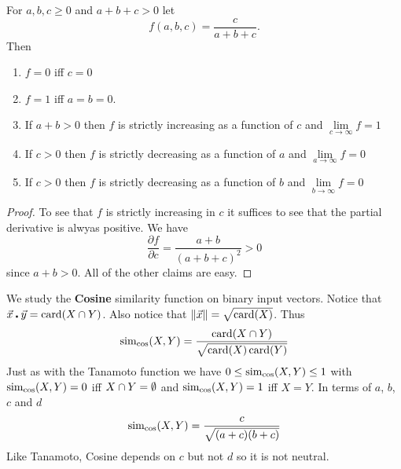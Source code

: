 \documentclass{article}
\begin{document}
\begin{proposition}
For $a,b,c\geq 0$ and $a+b+c>0$ let 
\begin{equation}
f(a,b,c)=\frac{c}{a+b+c}.
\end{equation}
Then
\begin{enumerate}
  \item $f=0$ iff $c=0$
  \item $f=1$ iff $a=b=0$. 
  \item If $a+b>0$ then $f$ is strictly increasing as a function of $c$ and
  $\lim\limits_{c\to\infty}f=1$
  \item If $c>0$ then $f$ is strictly decreasing as a function of $a$ and
  $\lim\limits_{a\to\infty}f=0$
  \item If $c>0$ then $f$ is strictly decreasing as a function of $b$ and
  $\lim\limits_{b\to\infty}f=0$
\end{enumerate}
\end{proposition}
\begin{proof}
To see that $f$ is strictly increasing in $c$ it suffices to see that the
partial derivative is alwyas positive. We have
\begin{equation} 
\frac{\partial f}{\partial c} = \frac{a+b}{(a+b+c)^2} > 0
\end{equation}
since $a+b>0$. All of the other claims are easy.
\end{proof}

\begin{example}We study the \textbf{Cosine} similarity function on binary input
vectors. Notice that $\vec{x}\centerdot\vec{y}=\operatorname{card}(X\cap Y)$. Also notice
that $\|\vec{x}\|=\sqrt{\operatorname{card}(X)}$. Thus
\begin{equation}
\operatorname{sim_{cos}}(X,Y) = \frac{\operatorname{card}(X\cap Y)}{\sqrt{\operatorname{card}(X)\operatorname{card}(Y)}}
\end{equation}
Just as with the Tanamoto function we have $0\leq \operatorname{sim_{cos}}(X,Y)\leq 1$ with $\operatorname{sim_{cos}}(X,Y)=0$ iff
$X\cap Y=\emptyset$ and $\operatorname{sim_{cos}}(X,Y)=1$ iff $X=Y$. 
In terms of $a$, $b$, $c$ and $d$
\begin{equation}
\operatorname{sim_{cos}}(X,Y) = \frac{c}{\sqrt{(a+c)(b+c)}}
\end{equation}
Like Tanamoto, Cosine depends on $c$ but not $d$ so it is not neutral.
\end{example}
\end{document}
